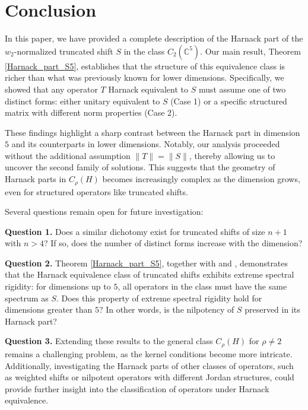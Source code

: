 \documentclass[12pt, reqno]{amsart}
\theoremstyle{definition}
\theoremstyle{remark}
\numberwithin{equation}{section}
\begin{document}
\section{Conclusion}

In this paper, we have provided a complete description of the Harnack part of the $w_2$-normalized truncated shift $S$ in the class $C_2(\mathbb{C}^5)$. Our main result, Theorem \ref{Harnack_part_S5}, establishes that the structure of this equivalence class is richer than what was previously known for lower dimensions. Specifically, we showed that any operator $T$ Harnack equivalent to $S$ must assume one of two distinct forms: either unitary equivalent to $S$ (Case 1) or a specific structured matrix with different norm properties (Case 2).

These findings highlight a sharp contrast between the Harnack part in dimension $5$ and its counterparts in lower dimensions. Notably, our analysis proceeded without the additional assumption $\|T\| = \|S\|$, thereby allowing us to uncover the second family of solutions. This suggests that the geometry of Harnack parts in $C_\rho(H)$ becomes increasingly complex as the dimension grows, even for structured operators like truncated shifts.

Several questions remain open for future investigation:

\noindent\textbf{Question 1.} Does a similar dichotomy exist for truncated shifts of size $n+1$ with $n > 4$? If so, does the number of distinct forms increase with the dimension?

\noindent\textbf{Question 2.} Theorem \ref{Harnack_part_S5}, together with \cite[Theorem 3.3]{CaNaBe2024} and \cite[Theorems 3.1 and 3.3]{CaBeBel2018}, demonstrates that the Harnack equivalence class of truncated shifts exhibits extreme spectral rigidity: for dimensions up to $5$, all operators in the class must have the same spectrum as $S$. Does this property of extreme spectral rigidity hold for dimensions greater than $5$? In other words, is the nilpotency of $S$ preserved in its Harnack part?
	
\noindent\textbf{Question 3.} Extending these results to the general class $C_\rho(H)$ for $\rho \neq 2$ remains a challenging problem, as the kernel conditions become more intricate. Additionally, investigating the Harnack parts of other classes of operators, such as weighted shifts or nilpotent operators with different Jordan structures, could provide further insight into the classification of operators under Harnack equivalence.
\end{document}
